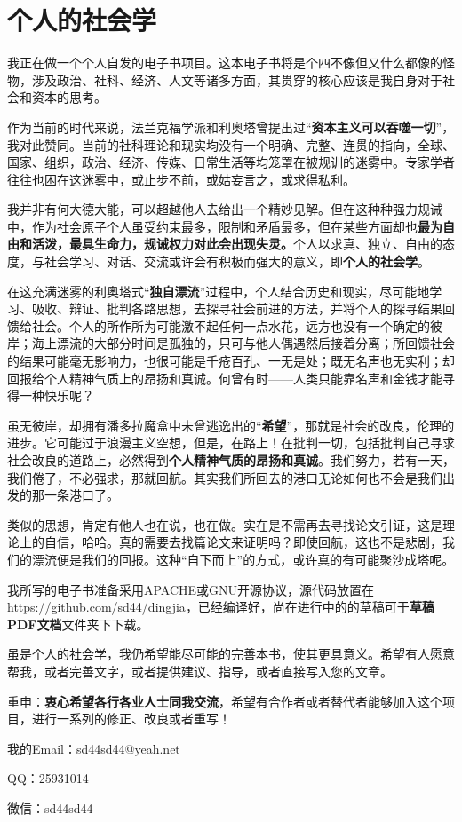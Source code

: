 \chapter{个人的社会学}

我正在做一个个人自发的电子书项目。这本电子书将是个四不像但又什么都像的怪物，涉及政治、社科、经济、人文等诸多方面，其贯穿的核心应该是我自身对于社会和资本的思考。

作为当前的时代来说，法兰克福学派和利奥塔曾提出过“\textbf{资本主义可以吞噬一切}”，我对此赞同。当前的社科理论和现实均没有一个明确、完整、连贯的指向，全球、国家、组织，政治、经济、传媒、日常生活等均笼罩在被规训的迷雾中。专家学者往往也困在这迷雾中，或止步不前，或姑妄言之，或求得私利。

我并非有何大德大能，可以超越他人去给出一个精妙见解。但在这种种强力规诫中，作为社会原子个人虽受约束最多，限制和矛盾最多，但在某些方面却也\textbf{最为自由和活泼，最具生命力，规诫权力对此会出现失灵。}个人以求真、独立、自由的态度，与社会学习、对话、交流或许会有积极而强大的意义，即\textbf{个人的社会学}。

在这充满迷雾的利奥塔式“\textbf{独自漂流}”过程中，个人结合历史和现实，尽可能地学习、吸收、辩证、批判各路思想，去探寻社会前进的方法，并将个人的探寻结果回馈给社会。个人的所作所为可能激不起任何一点水花，远方也没有一个确定的彼岸；海上漂流的大部分时间是孤独的，只可与他人偶遇然后接着分离；所回馈社会的结果可能毫无影响力，也很可能是千疮百孔、一无是处；既无名声也无实利；却回报给个人精神气质上的昂扬和真诚。何曾有时——人类只能靠名声和金钱才能寻得一种快乐呢？

虽无彼岸，却拥有潘多拉魔盒中未曾逃逸出的“\textbf{希望}”，那就是社会的改良，伦理的进步。它可能过于浪漫主义空想，但是，在路上！在批判一切，包括批判自己寻求社会改良的道路上，必然得到\textbf{个人精神气质的昂扬和真诚}。我们努力，若有一天，我们倦了，不必强求，那就回航。其实我们所回去的港口无论如何也不会是我们出发的那一条港口了。

类似的思想，肯定有他人也在说，也在做。实在是不需再去寻找论文引证，这是理论上的自信，哈哈。真的需要去找篇论文来证明吗？即使回航，这也不是悲剧，我们的漂流便是我们的回报。这种“自下而上”的方式，或许真的有可能聚沙成塔呢。

我所写的电子书准备采用APACHE或GNU开源协议，源代码放置在\url{https://github.com/sd44/dingjia}，已经编译好，尚在进行中的的草稿可于\textbf{草稿PDF文档}文件夹下下载。

虽是个人的社会学，我仍希望能尽可能的完善本书，使其更具意义。希望有人愿意帮我，或者完善文字，或者提供建议、指导，或者直接写入您的文章。

重申：\textbf{衷心希望各行各业人士同我交流}，希望有合作者或者替代者能够加入这个项目，进行一系列的修正、改良或者重写！

我的Email：\href{mailto:sd44sd44@yeah.net}{sd44sd44@yeah.net}

QQ：25931014

微信：sd44sd44
